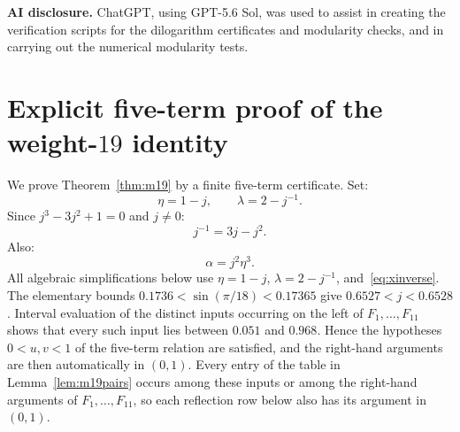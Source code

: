 \documentclass[preprint,12pt,number]{elsarticle}
\theoremstyle{remark}
\begin{document}
\medskip
\noindent\textbf{AI disclosure.}
ChatGPT, using GPT-5.6 Sol, was used to assist in creating the verification
scripts for the dilogarithm certificates and modularity checks, and in
carrying out the numerical modularity tests.

\appendix
\section{Explicit five-term proof of the weight-$19$ identity}
\label{app:m19}

We prove Theorem~\ref{thm:m19} by a finite five-term certificate.  Set:
\begin{equation}\label{eq:xylambda}
\eta=1-j,\qquad
\lambda=2-j^{-1}.
\end{equation}
Since $j^3-3j^2+1=0$ and $j\ne0$:
\begin{equation}\label{eq:xinverse}
j^{-1}=3j-j^2.
\end{equation}
Also:
\begin{equation}\label{eq:alphaXY}
\alpha=j^2\eta^3.
\end{equation}
All algebraic simplifications below use $\eta=1-j$, $\lambda=2-j^{-1}$,
and~\eqref{eq:xinverse}.  The elementary bounds
$0.1736<\sin(\pi/18)<0.17365$ give $0.6527<j<0.6528$.
Interval evaluation of the distinct inputs occurring on the left of
$F_1,\ldots,F_{11}$ shows that every such input lies between $0.051$ and $0.968$.
Hence the hypotheses $0<u,v<1$ of the five-term relation are satisfied,
and the right-hand arguments are then automatically in $(0,1)$.  Every entry
of the table in Lemma~\ref{lem:m19pairs} occurs among these inputs or among the
right-hand arguments of $F_1,\ldots,F_{11}$, so each reflection row below also
has its argument in $(0,1)$.
\end{document}
